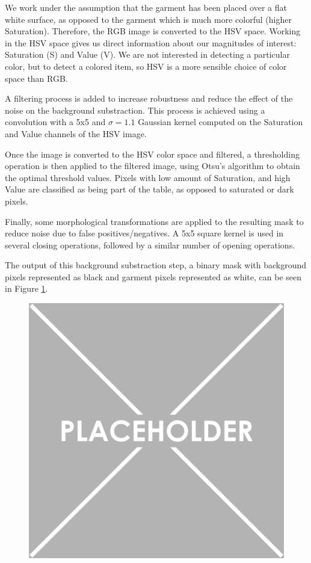 We work under the assumption that the garment has been placed over a flat white surface, as opposed to the garment which is much more colorful (higher Saturation). Therefore, the RGB image is converted to the HSV space. Working in the HSV space gives us direct information about our magnitudes of interest: Saturation (S) and Value (V). We are not interested in detecting a particular color, but to detect a colored item, so HSV is a more sensible choice of color space than RGB. 

A filtering process is added to increase robustness and reduce the effect of the noise on the background substraction. This process is achieved using a convolution with a 5x5 and $\sigma=1.1$ Gaussian kernel computed on the Saturation and Value channels of the HSV image.

Once the image is converted to the HSV color space and filtered, a thresholding operation is then applied to the filtered image, using Otsu's algorithm  to obtain the optimal threshold values. Pixels with low amount of Saturation, and high Value are classified as being part of the table, as opposed to saturated or dark pixels.

Finally, some morphological transformations are applied to the resulting mask to reduce noise due to false positives/negatives. A 5x5 square kernel is used in several closing operations, followed by a similar number of opening operations. 

The output of this background substraction step, a binary mask with background pixels represented as black and garment pixels represented as white, can be seen in Figure \ref{fig:segmentation_mask}.

\begin{figure}[thpb]
    \centering
    \includegraphics[width=0.48
    \textwidth]{figures/placeholder.png}
    \caption{}
    \label{fig:segmentation_mask}
\end{figure}

